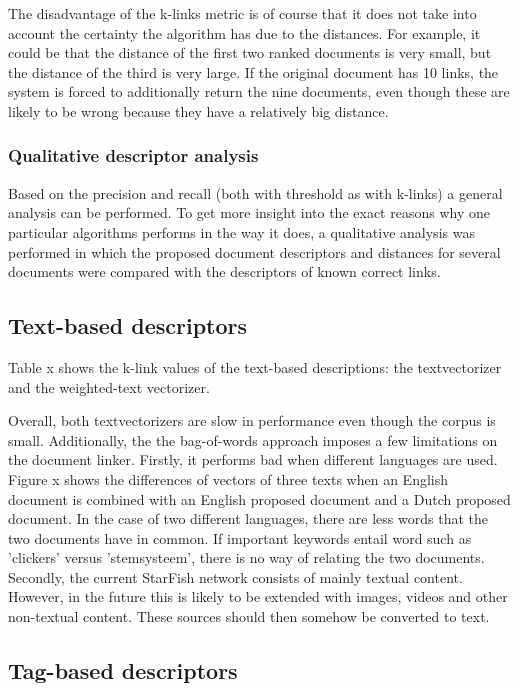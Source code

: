 The disadvantage of the k-links metric is of course that it does not take into account the certainty the algorithm has due to the distances. For example, it could be that the distance of the first two ranked documents is very small, but the distance of the third is very large. If the original document has 10 links, the system is forced to additionally return the nine documents, even though these are likely to be wrong because they have a relatively big distance. 

\subsubsection{Qualitative descriptor analysis}
Based on the precision and recall (both with threshold as with k-links) a general analysis can be performed. To get more insight into the exact reasons why one particular algorithms performs in the way it does, a qualitative analysis was performed in which the proposed document descriptors and distances for several documents were compared with the descriptors of known correct links. 

\subsection{Text-based descriptors}
Table x shows the k-link values of the text-based descriptions: the textvectorizer and the weighted-text vectorizer. 

Overall, both textvectorizers are slow in performance even though the corpus is small. Additionally, the the bag-of-words approach imposes a few limitations on the document linker. Firstly, it performs bad when different languages are used. Figure x shows the differences of vectors of three texts when an English document is combined with an English proposed document and a Dutch proposed document. In the case of two different languages, there are less words that the two documents have in common. If important keywords entail word such as 'clickers' versus 'stemsysteem', there is no way of relating the two documents. Secondly, the current StarFish network consists of mainly textual content. However, in the future this is likely to be extended with images, videos and other non-textual content. These sources should then somehow be converted to text.

\subsection{Tag-based descriptors}

